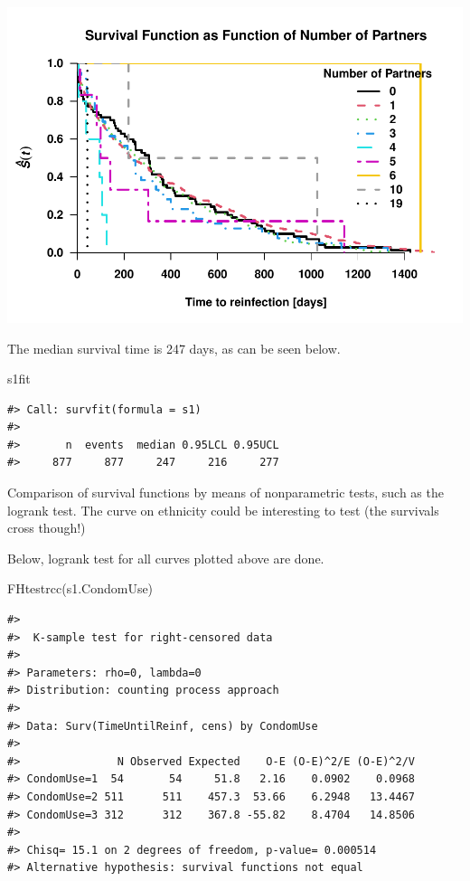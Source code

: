 \documentclass[
]{article}
\newenvironment{Shaded}{\begin{snugshade}}{\end{snugshade}}
\newcommand{\FunctionTok}[1]{\textcolor[rgb]{0.00,0.00,0.00}{#1}}
\newcommand{\NormalTok}[1]{#1}
\begin{document}
\includegraphics{practical_files/figure-latex/unnamed-chunk-10-1.pdf}

The median survival time is 247 days, as can be seen below.

\begin{Shaded}
\begin{Highlighting}[]
\NormalTok{s1fit}
\end{Highlighting}
\end{Shaded}

\begin{verbatim}
#> Call: survfit(formula = s1)
#> 
#>       n  events  median 0.95LCL 0.95UCL 
#>     877     877     247     216     277
\end{verbatim}

Comparison of survival functions by means of nonparametric tests, such as the logrank test. The curve on ethnicity could be interesting to test (the survivals cross though!)

Below, logrank test for all curves plotted above are done.

\begin{Shaded}
\begin{Highlighting}[]
\FunctionTok{FHtestrcc}\NormalTok{(s1.CondomUse)}
\end{Highlighting}
\end{Shaded}

\begin{verbatim}
#> 
#>  K-sample test for right-censored data
#> 
#> Parameters: rho=0, lambda=0
#> Distribution: counting process approach
#> 
#> Data: Surv(TimeUntilReinf, cens) by CondomUse
#> 
#>               N Observed Expected    O-E (O-E)^2/E (O-E)^2/V
#> CondomUse=1  54       54     51.8   2.16    0.0902    0.0968
#> CondomUse=2 511      511    457.3  53.66    6.2948   13.4467
#> CondomUse=3 312      312    367.8 -55.82    8.4704   14.8506
#> 
#> Chisq= 15.1 on 2 degrees of freedom, p-value= 0.000514
#> Alternative hypothesis: survival functions not equal
\end{verbatim}
\end{document}
